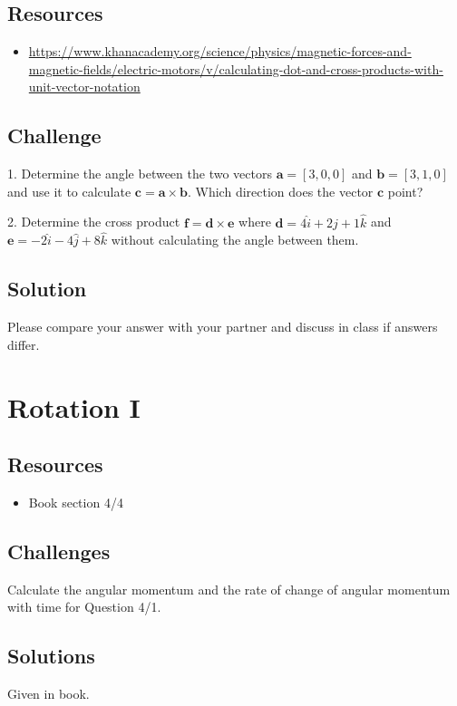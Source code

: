 \subsection*{Resources}
\begin{itemize}
    \item \url{https://www.khanacademy.org/science/physics/magnetic-forces-and-magnetic-fields/electric-motors/v/calculating-dot-and-cross-products-with-unit-vector-notation}
\end{itemize}


\subsection*{Challenge}
1. Determine the angle between the two vectors $\bm{a} = [3,0,0]$ and $\bm{b} = [3,1,0]$ and use it to calculate $\bm{c} = \bm{a} \times \bm{b}$. Which direction does the vector $\bm{c}$ point?

2. Determine the cross product $\bm{f} = \bm{d} \times \bm{e}$ where $\bm{d} = 4 \hat{i}+ 2 \hat{j} + 1 \hat{k}$ and $\bm{e} = -2 \hat{i} -4 \hat{j} + 8 \hat{k}$ without calculating the angle between them.

\subsection*{Solution}
Please compare your answer with your partner and discuss in class if answers differ.




\newpage
\section{Rotation I}

\subsection*{Resources}
\begin{itemize}
    \item Book section 4/4
\end{itemize}

\subsection*{Challenges}
Calculate the angular momentum and the rate of change of angular momentum with time for Question 4/1.

\subsection*{Solutions}
Given in book.




